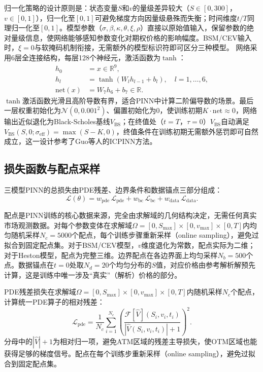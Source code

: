 归一化策略的设计原则是：状态变量$S$和$v$的量级差异较大（$S\in[0,300]$，$v\in[0,1]$），归一化至$[0,1]$可避免梯度方向因量级悬殊而失衡；时间维度$t/T$同理归一化至$[0,1]$。模型参数（$\sigma,\beta,\kappa,\theta,\xi,\rho$）直接以原始值输入，保留参数的绝对量级信息，使网络能够感知参数变化对期权价格的影响幅度。BSM/CEV输入时，$\xi=0$与软掩码机制衔接，无需额外的模型标识符即可区分三种模型。
网络采用6层全连接结构，每层128个神经元，激活函数为$\tanh$：
\begin{align}
  h_0 &= x \in \mathbb{R}^9, \\
  h_l &= \tanh(W_l h_{l-1} + b_l), \quad l=1,\ldots,6, \\
  \text{net}(x) &= W_7 h_6 + b_7 \in \mathbb{R}.
\end{align}
$\tanh$激活函数光滑且高阶导数有界，适合PINN中计算二阶偏导数的场景。最后一层权重初始化为$\mathcal{N}(0,0.001^2)$、偏置初始化为0，使训练初期$K\cdot\text{net}\approx 0$，网络输出近似退化为Black-Scholes基线$V_\text{BS}$；在终值处（$t=T$，$\tau=0$）$V_\text{BS}$自动满足$V_\text{BS}(S,0;\sigma_\text{eff})=\max(S-K,0)$，终值条件在训练初期无需额外惩罚即可自然成立，这一设计参考了Guo等人\cite{guo2024icpinn}的ICPINN方法。

\subsection{损失函数与配点采样}

三模型PINN的总损失由PDE残差、边界条件和数据锚点三部分组成：
\begin{equation}\label{eq:total_loss}
  \mathcal{L}(\theta) = w_\text{pde}\,\mathcal{L}_\text{pde}
                      + w_\text{bc}\,\mathcal{L}_\text{bc}
                      + w_\text{data}\,\mathcal{L}_\text{data}.
\end{equation}

配点是PINN训练的核心数据来源，完全由求解域的几何结构决定，无需任何真实市场观测数据。对每个参数变体在求解域$\Omega=[0,S_\text{max}]\times[0,v_\text{max}]\times[0,T]$内均匀随机采样$N_c=5000$个配点，每个训练步骤重新采样（online sampling），避免过拟合到固定配点集。对于BSM/CEV模型，$v$维度退化为常数，配点实际为二维；对于Heston模型，配点为完整三维。边界配点在各边界面上均匀采样$N_b=500$个点。数据锚点在$t=0$处取$N_d=20$个均匀分布的$S$值，对应价格由参考解析解预先计算，这是训练中唯一涉及``真实''（解析）价格的部分。

PDE残差损失在求解域$\Omega=[0,S_\text{max}]\times[0,v_\text{max}]\times[0,T]$内随机采样$N_c$个配点，计算统一PDE算子的相对残差：
\begin{equation}
  \mathcal{L}_\text{pde} = \frac{1}{N_c}\sum_{i=1}^{N_c}
    \left(\frac{\mathcal{F}[\hat{V}](S_i,v_i,t_i)}{|\hat{V}(S_i,v_i,t_i)|+1}\right)^2.
\end{equation}
分母中的$|\hat{V}|+1$为相对归一项，避免ATM区域的残差主导损失，使OTM区域也能获得足够的梯度信号。配点在每个训练步重新采样（online sampling），避免过拟合到固定配点集。

